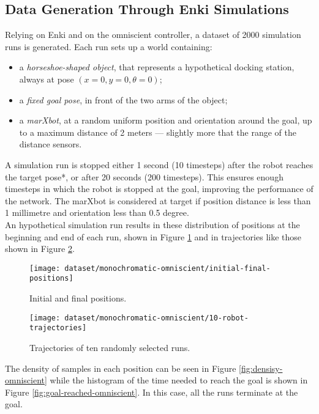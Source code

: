 \subsection{Data Generation Through Enki Simulations}
Relying on Enki and on the omniscient controller, a dataset of 2000 simulation 
runs is generated. 
Each run sets up a world containing:
\begin{itemize}
	\item a \emph{horseshoe-shaped object}, that represents a hypothetical 
	docking 
	station, always at pose $(x=0, y=0, \theta=0)$;
	\item a \emph{fixed goal pose}, in front of the two arms of the object;
	\item a \emph{marXbot}, at a random uniform position and orientation 
	around the 
	goal, up to a maximum distance of 2 meters --- slightly more that the range 
	of the distance sensors.\\
\end{itemize}

A simulation run is stopped either 1 second (10 timesteps) after the robot 
reaches the target pose*, or after 20 seconds (200 timesteps). This ensures 
enough timesteps in which the robot is stopped at the goal, improving 
the performance of the network. The marXbot is considered at target if position 
distance is less than 1 millimetre and orientation less than 0.5 degree.
\\

An hypothetical simulation run results in these distribution of positions at 
the beginning and end of each run, shown 
in Figure \ref{fig:initial-final-positions-omniscient} and in trajectories like 
those shown in Figure 
\ref{fig:trajectories-omniscient}.

\begin{figure}[htbp]
\centerline{\texttt{[image: dataset/monochromatic-omniscient/initial-final-positions]}}
	\caption{Initial and final positions.}
	\label{fig:initial-final-positions-omniscient}
\end{figure}

\begin{figure}[htbp]
\centerline{\texttt{[image: dataset/monochromatic-omniscient/10-robot-trajectories]}}
	\caption{Trajectories of ten randomly selected runs.}
	\label{fig:trajectories-omniscient}
\end{figure}

The density of samples in each position can be seen in Figure 
\ref{fig:densisy-omniscient} while the histogram of the time needed to reach 
the goal is shown in Figure \ref{fig:goal-reached-omniscient}. In this case, 
all the runs terminate at the goal.\\

